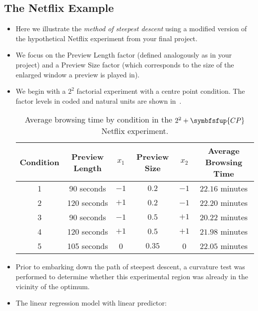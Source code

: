 \subsection{The Netflix Example}
\begin{itemize}
    \item Here we illustrate the \emph{method of steepest descent} using a modified version of the hypothetical Netflix
          experiment from your final project.
    \item We focus on the Preview Length factor (defined analogously as in your project) and a Preview Size
          factor (which corresponds to the size of the enlarged window a preview is played in).
    \item We begin with a $2^2$ factorial experiment with a centre point condition. The factor levels in coded and
          natural units are shown in~.
          \begin{table}[!htbp]
              \centering
              \caption{Average browsing time by condition in the $2^2 + \symbfsfup{CP}$ Netflix experiment.}\label{tab:netflixtab1}
              \begin{tabular}{cccccc}
                  \toprule Condition & Preview Length & $x_{1}$ & Preview Size & $x_{2}$ & Average Browsing Time \\
                  \midrule 1         & 90 seconds     & $-1$    & $0.2$        & $-1$    & $22.16$ minutes       \\
                  2                  & 120 seconds    & $+1$    & $0.2$        & $-1$    & $22.20$ minutes       \\
                  3                  & 90 seconds     & $-1$    & $0.5$        & $+1$    & $20.22$ minutes       \\
                  4                  & 120 seconds    & $+1$    & $0.5$        & $+1$    & $21.98$ minutes       \\
                  5                  & 105 seconds    & 0       & $0.35$       & 0       & $22.05$ minutes       \\
                  \bottomrule
              \end{tabular}
          \end{table}
    \item Prior to embarking down the path of steepest descent, a curvature test was performed to determine
          whether this experimental region was already in the vicinity of the optimum.
    \item The linear regression model with linear predictor:

\end{itemize}
